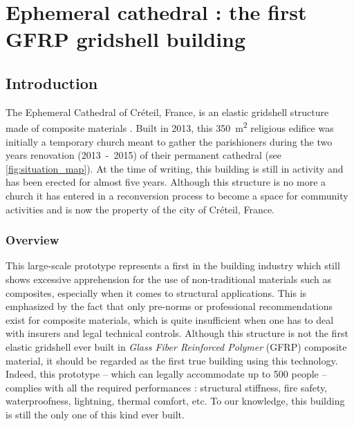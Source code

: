 
\chapter{Ephemeral cathedral : the first GFRP gridshell building}

\section{Introduction}

The Ephemeral Cathedral of Créteil, France, is an elastic gridshell structure made of composite materials \cite{DuPeloux2016}. Built in 2013, this \SI{350}{m^2} religious edifice was initially a temporary church meant to gather the parishioners during the two years renovation (2013~-~2015) of their permanent cathedral (see \cref{fig:situation_map}). At the time of writing, this building is still in activity and has been erected for almost five years. Although this structure is no more a church it has entered in a reconversion process to become a space for community activities and is now the property of the city of Créteil, France.

\subsection{Overview}
This large-scale prototype represents a first in the building industry which still shows excessive apprehension for the use of non-traditional materials such as composites, especially when it comes to structural applications. This is emphasized by the fact that only pre-norms or professional recommendations exist for composite materials, which is quite insufficient when one has to deal with insurers and legal technical controls.
Although this structure is not the first elastic gridshell ever built in \emph{Glass Fiber Reinforced Polymer} (GFRP) composite material, it should be regarded as the first true building using this technology. Indeed, this prototype -- which can legally accommodate up to 500 people -- complies with all the required performances : structural stiffness, fire safety, waterproofness, lightning, thermal comfort, etc. To our knowledge, this building is still the only one of this kind ever built.

